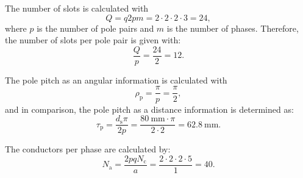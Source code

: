 \begin{solutionblock}
    The number of slots is calculated with
    \begin{equation}
        Q = q 2 p m
        = 2\cdot 2\cdot 2\cdot 3
        = 24,
    \end{equation}
    where $p$ is the number of pole pairs and $m$ is the number of phases. Therefore, the number of slots per pole pair is given with:
    \begin{equation}
        \frac{Q}{p} = \frac{24}{2} = 12.
    \end{equation}

    The pole pitch as an angular information is calculated with
    \begin{equation}
        \rho_{\mathrm{p}} = \frac{\pi}{p}
        = \frac{\pi}{2},
    \end{equation}
    and in comparison, the pole pitch as a distance information is determined as:
    \begin{equation}
        \tau_{\mathrm{p}} = \frac{d_{\mathrm{s}}\pi}{2p}
        = \frac{\SI{80}{\milli \metre \cdot \pi}}{2 \cdot 2}
        = \SI{62.8}{\milli\metre}.
    \end{equation}

    The conductors per phase are calculated by:
    \begin{equation}
        N_{\mathrm{a}} = \frac{2pqN_{\mathrm{c}}}{a}
        = \frac{2\cdot 2\cdot 2\cdot 5}{1}
        = 40.
    \end{equation}
\end{solutionblock}



